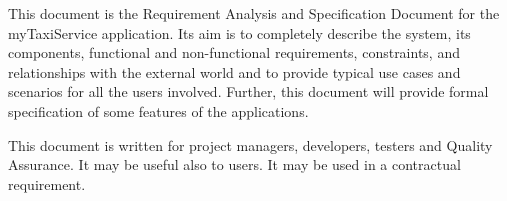 This document is the  Requirement Analysis and Specification Document for the myTaxiService application.
Its aim is to completely describe the system, its components, functional and non-functional requirements, constraints, and relationships with the external world and to provide typical use cases and scenarios for all the users involved.
Further, this document will provide formal specification of some features of the applications.

This document is written for project managers, developers, testers and Quality Assurance. It may be useful also to users. It may be used in a contractual requirement.